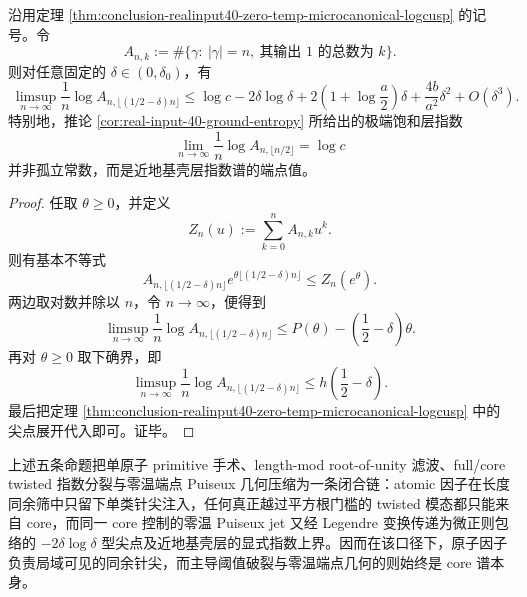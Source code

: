 \begin{corollary}[近地基壳层的显式指数上界]\label{cor:conclusion-realinput40-near-ground-shell-exponential-bound}
沿用定理 \ref{thm:conclusion-realinput40-zero-temp-microcanonical-logcusp} 的记号。令
\[
A_{n,k}
:=
\#\{\gamma:\ |\gamma|=n,\ \text{其输出 }1\text{ 的总数为 }k\}.
\]
则对任意固定的 \(\delta\in(0,\delta_0)\)，有
\[
\boxed{\;
\limsup_{n\to\infty}
\frac1n\log A_{n,\lfloor(1/2-\delta)n\rfloor}
\le
\log c
-2\delta\log\delta
+2\left(1+\log\frac{a}{2}\right)\delta
+\frac{4b}{a^2}\delta^2
+O(\delta^3).
\;}
\]
特别地，推论 \ref{cor:real-input-40-ground-entropy} 所给出的极端饱和层指数
\[
\lim_{n\to\infty}\frac1n\log A_{n,\lfloor n/2\rfloor}=\log c
\]
并非孤立常数，而是近地基壳层指数谱的端点值。
\end{corollary}
\begin{proof}
任取 \(\theta\ge 0\)，并定义
\[
Z_n(u):=\sum_{k=0}^{n}A_{n,k}u^k.
\]
则有基本不等式
\[
A_{n,\lfloor(1/2-\delta)n\rfloor}e^{\theta\lfloor(1/2-\delta)n\rfloor}
\le
Z_n(e^\theta).
\]
两边取对数并除以 \(n\)，令 \(n\to\infty\)，便得到
\[
\limsup_{n\to\infty}\frac1n\log A_{n,\lfloor(1/2-\delta)n\rfloor}
\le
P(\theta)-\left(\frac12-\delta\right)\theta.
\]
再对 \(\theta\ge 0\) 取下确界，即
\[
\limsup_{n\to\infty}\frac1n\log A_{n,\lfloor(1/2-\delta)n\rfloor}
\le
h\!\left(\frac12-\delta\right).
\]
最后把定理 \ref{thm:conclusion-realinput40-zero-temp-microcanonical-logcusp} 中的尖点展开代入即可。证毕。
\end{proof}

上述五条命题把单原子 primitive 手术、length-mod root-of-unity 滤波、full/core twisted 指数分裂与零温端点 Puiseux 几何压缩为一条闭合链：atomic 因子在长度同余筛中只留下单类针尖注入，任何真正越过平方根门槛的 twisted 模态都只能来自 core，而同一 core 控制的零温 Puiseux jet 又经 Legendre 变换传递为微正则包络的 \(-2\delta\log\delta\) 型尖点及近地基壳层的显式指数上界。因而在该口径下，原子因子负责局域可见的同余针尖，而主导阈值破裂与零温端点几何的则始终是 core 谱本身。

\endinput
